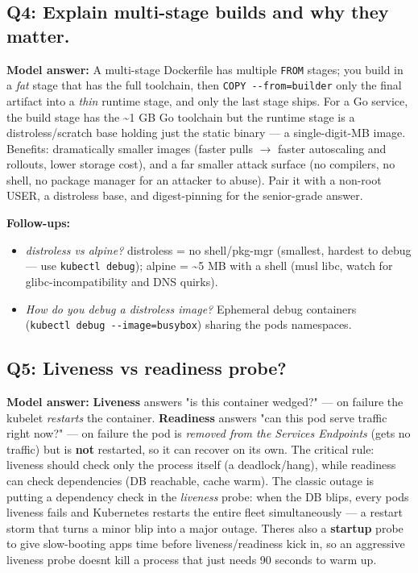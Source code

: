 \documentclass[11pt]{article}
\providecommand{\tightlist}{\setlength{\itemsep}{1pt}\setlength{\parskip}{0pt}}
\begin{document}
\subsection{Q4: Explain multi-stage builds and why they matter.}\label{q4-explain-multi-stage-builds-and-why-they-matter}

\textbf{Model answer:}
A multi-stage Dockerfile has multiple \texttt{FROM} stages; you build in a \emph{fat} stage that has the full toolchain, then \texttt{COPY\ -\/-from=builder} only the final artifact into a \emph{thin} runtime stage, and only the last stage ships. For a Go service, the build stage has the \textasciitilde1 GB Go toolchain but the runtime stage is a distroless/scratch base holding just the static binary --- a single-digit-MB image. Benefits: dramatically smaller images (faster pulls \(\rightarrow\) faster autoscaling and rollouts, lower storage cost), and a far smaller attack surface (no compilers, no shell, no package manager for an attacker to abuse). Pair it with a non-root USER, a distroless base, and digest-pinning for the senior-grade answer.

\textbf{Follow-ups:}

\begin{itemize}
\tightlist
\item
  \emph{distroless vs alpine?} distroless = no shell/pkg-mgr (smallest, hardest to debug --- use \texttt{kubectl\ debug}); alpine = \textasciitilde5 MB with a shell (musl libc, watch for glibc-incompatibility and DNS quirks).
\item
  \emph{How do you debug a distroless image?} Ephemeral debug containers (\texttt{kubectl\ debug\ -\/-image=busybox}) sharing the pod\textquotesingle s namespaces.
\end{itemize}

\subsection{Q5: Liveness vs readiness probe?}\label{q5-liveness-vs-readiness-probe}

\textbf{Model answer:}
\textbf{Liveness} answers "is this container wedged?" --- on failure the kubelet \emph{restarts} the container. \textbf{Readiness} answers "can this pod serve traffic right now?" --- on failure the pod is \emph{removed from the Service\textquotesingle s Endpoints} (gets no traffic) but is \textbf{not} restarted, so it can recover on its own. The critical rule: liveness should check only the process itself (a deadlock/hang), while readiness can check dependencies (DB reachable, cache warm). The classic outage is putting a dependency check in the \emph{liveness} probe: when the DB blips, every pod\textquotesingle s liveness fails and Kubernetes restarts the entire fleet simultaneously --- a restart storm that turns a minor blip into a major outage. There\textquotesingle s also a \textbf{startup} probe to give slow-booting apps time before liveness/readiness kick in, so an aggressive liveness probe doesn\textquotesingle t kill a process that just needs 90 seconds to warm up.
\end{document}
